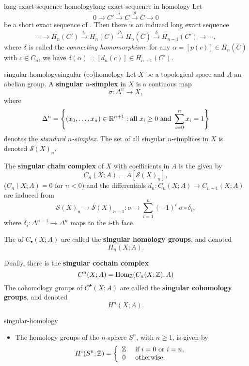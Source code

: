 \begin{topic}{long-exact-sequence-homology}{long exact sequence in homology}
    Let
    \[ 0 \rightarrow C' \xrightarrow{i} C \xrightarrow{p} \overline{C} \rightarrow 0 \]
    be a short exact sequence of . Then there is an induced long exact sequence
    \[ \cdots \rightarrow H_n(C') \xrightarrow{i_*} H_n(C) \xrightarrow{p_*} H_n(\overline{C}) \xrightarrow{\delta} H_{n - 1}(C') \rightarrow \cdots , \]
    where $\delta$ is called the \textit{connecting homomorphism}: for any $\alpha = [ p(c) ] \in H_n(\overline{C})$ with $c \in C_n$, we have $\delta(\alpha) = [ d_n(c) ] \in H_{n - 1}(C')$.
\end{topic}

\begin{topic}{singular-homology}{singular (co)homology}
    Let $X$ be a topological space and $A$ an abelian group. A \textbf{singular $n$-simplex} in $X$ is a continous map
    \[ \sigma : \Delta^n \to X , \]
    where 
    \[ \Delta^n = \left\{ (x_0, \ldots, x_n) \in \mathbb{R}^{n + 1} : \text{all } x_i \ge 0 \text{ and } \sum_{i = 0}^n x_i = 1 \right\} \]
    denotes the \textit{standard $n$-simplex}. The set of all singular $n$-simplices in $X$ is denoted $\mathcal{S}(X)_n$.
    
    The \textbf{singular chain complex} of $X$ with coefficients in $A$ is the  given by
    \[ C_n(X; A) = A[\mathcal{S}(X)_n] , \]
    ($C_n(X; A) = 0$ for $n < 0$) and the differentials $d_n : C_n(X; A) \to C_{n - 1}(X; A)$ are induced from
    \[ \mathcal{S}(X)_n \to \mathcal{S}(X)_{n - 1} : \sigma \mapsto \sum_{i = 1}^{n} (-1)^i \; \sigma \circ \delta_i , \]
    where $\delta_i : \Delta^{n - 1} \to \Delta^n$ maps to the $i$-th face.
    
    The  of $C_\bullet(X; A)$ are called the \textbf{singular homology groups}, and denoted
    \[ H_n(X; A) . \]
    
    Dually, there is the \textbf{singular cochain complex}
    \[ C^n(X; A) = \text{Hom}_{\mathbb{Z}}(C_n(X; \mathbb{Z}), A) \]
    The cohomology groups of $C^\bullet(X; A)$ are called the \textbf{singular cohomology groups}, and denoted
    \[ H^n(X; A) . \]
\end{topic}

\begin{example}{singular-homology}
    \begin{itemize}
        \item The homology groups of the $n$-sphere $S^n$, with $n \ge 1$, is given by
        \[ H^i(S^n; \mathbb{Z}) = \left\{ \begin{array}{cl} \mathbb{Z} & \textup{ if } i = 0 \textup{ or } i = n , \\ 0 & \textup{ otherwise}. \end{array} \right. \]
    \end{itemize}
\end{example}

